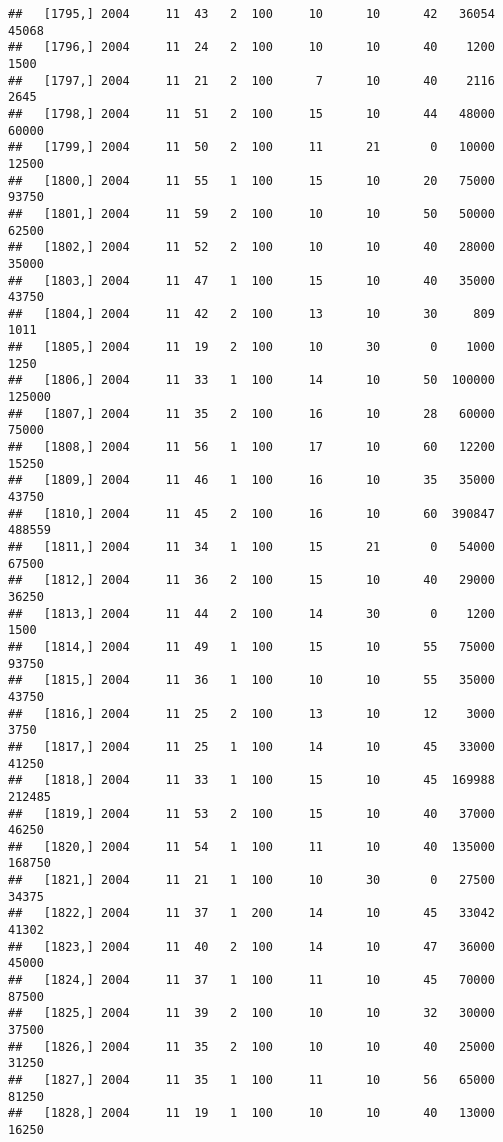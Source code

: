 \documentclass{article}\usepackage[]{graphicx}\usepackage[]{color}
\makeatletter
\newenvironment{kframe}{%
 \def\at@end@of@kframe{}%
 \ifinner\ifhmode%
  \def\at@end@of@kframe{\end{minipage}}%
  \begin{minipage}{\columnwidth}%
 \fi\fi%
 \def\FrameCommand##1{\hskip\@totalleftmargin \hskip-\fboxsep
 \colorbox{shadecolor}{##1}\hskip-\fboxsep
     \hskip-\linewidth \hskip-\@totalleftmargin \hskip\columnwidth}%
 \MakeFramed {\advance\hsize-\width
   \@totalleftmargin\z@ \linewidth\hsize
   \@setminipage}}%
 {\par\unskip\endMakeFramed%
 \at@end@of@kframe}
\newenvironment{knitrout}{}{} %
\makeatother
\begin{document}
\begin{knitrout}
\begin{kframe}
\begin{verbatim}
##   [1795,] 2004     11  43   2  100     10      10      42   36054   45068
##   [1796,] 2004     11  24   2  100     10      10      40    1200    1500
##   [1797,] 2004     11  21   2  100      7      10      40    2116    2645
##   [1798,] 2004     11  51   2  100     15      10      44   48000   60000
##   [1799,] 2004     11  50   2  100     11      21       0   10000   12500
##   [1800,] 2004     11  55   1  100     15      10      20   75000   93750
##   [1801,] 2004     11  59   2  100     10      10      50   50000   62500
##   [1802,] 2004     11  52   2  100     10      10      40   28000   35000
##   [1803,] 2004     11  47   1  100     15      10      40   35000   43750
##   [1804,] 2004     11  42   2  100     13      10      30     809    1011
##   [1805,] 2004     11  19   2  100     10      30       0    1000    1250
##   [1806,] 2004     11  33   1  100     14      10      50  100000  125000
##   [1807,] 2004     11  35   2  100     16      10      28   60000   75000
##   [1808,] 2004     11  56   1  100     17      10      60   12200   15250
##   [1809,] 2004     11  46   1  100     16      10      35   35000   43750
##   [1810,] 2004     11  45   2  100     16      10      60  390847  488559
##   [1811,] 2004     11  34   1  100     15      21       0   54000   67500
##   [1812,] 2004     11  36   2  100     15      10      40   29000   36250
##   [1813,] 2004     11  44   2  100     14      30       0    1200    1500
##   [1814,] 2004     11  49   1  100     15      10      55   75000   93750
##   [1815,] 2004     11  36   1  100     10      10      55   35000   43750
##   [1816,] 2004     11  25   2  100     13      10      12    3000    3750
##   [1817,] 2004     11  25   1  100     14      10      45   33000   41250
##   [1818,] 2004     11  33   1  100     15      10      45  169988  212485
##   [1819,] 2004     11  53   2  100     15      10      40   37000   46250
##   [1820,] 2004     11  54   1  100     11      10      40  135000  168750
##   [1821,] 2004     11  21   1  100     10      30       0   27500   34375
##   [1822,] 2004     11  37   1  200     14      10      45   33042   41302
##   [1823,] 2004     11  40   2  100     14      10      47   36000   45000
##   [1824,] 2004     11  37   1  100     11      10      45   70000   87500
##   [1825,] 2004     11  39   2  100     10      10      32   30000   37500
##   [1826,] 2004     11  35   2  100     10      10      40   25000   31250
##   [1827,] 2004     11  35   1  100     11      10      56   65000   81250
##   [1828,] 2004     11  19   1  100     10      10      40   13000   16250

\end{verbatim}
\end{kframe}
\end{knitrout}
\end{document}
